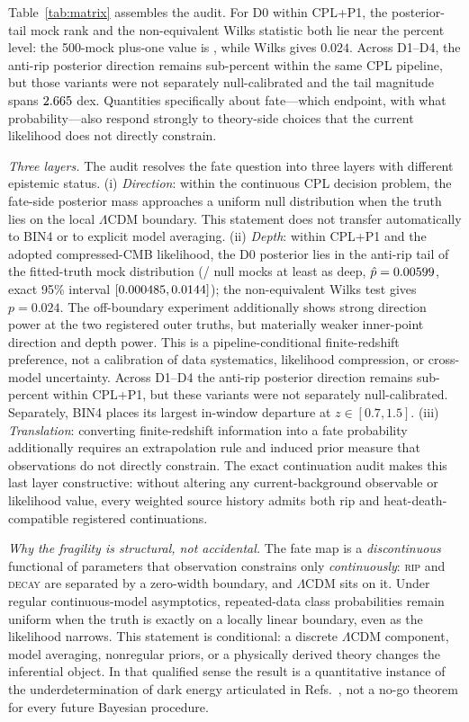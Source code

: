 \documentclass[a4paper,11pt]{article}
\newcommand{\lcdm}{\ensuremath{\Lambda\mathrm{CDM}}}
\begin{document}
Table~\ref{tab:matrix} assembles the audit. For D0 within CPL+P1, the
posterior-tail mock rank and the non-equivalent Wilks statistic both lie near
the percent level: the 500-mock plus-one value is \NullFivePlusOne, while
Wilks gives $0.024$. Across D1--D4, the anti-rip posterior direction remains
sub-percent within the same CPL pipeline, but those variants were not
separately null-calibrated and the tail magnitude spans $2.665$ dex.
Quantities specifically about fate---which endpoint, with what
probability---also respond strongly to theory-side choices that the current
likelihood does not directly constrain.

\emph{Three layers.} The audit resolves the fate question into three layers
with different epistemic status. (i) \emph{Direction}: within the continuous
CPL decision problem, the fate-side posterior mass approaches a uniform null
distribution when the truth lies on the local \lcdm{} boundary. This statement
does not transfer automatically to BIN4 or to explicit model averaging.
(ii) \emph{Depth}: within CPL+P1 and the adopted compressed-CMB likelihood,
the D0 posterior lies in the anti-rip tail of the fitted-truth mock distribution
(\NullFiveK/\NullFiveN{} null mocks at least as deep,
$\hat p=0.00599$, exact 95\% interval
$[0.000485,0.0144]$); the non-equivalent Wilks test gives
$p=0.024$. The off-boundary experiment additionally shows strong direction
power at the two registered outer truths, but materially weaker inner-point
direction and depth power. This is a pipeline-conditional finite-redshift
preference, not a calibration of data systematics, likelihood compression, or
cross-model uncertainty. Across D1--D4 the anti-rip posterior direction remains
sub-percent within CPL+P1, but these variants were not separately
null-calibrated. Separately, BIN4 places its largest in-window departure at
$z\in[0.7,1.5]$. (iii) \emph{Translation}: converting finite-redshift
information into a fate probability additionally requires an extrapolation
rule and induced prior measure that observations do not directly constrain.
The exact continuation audit makes this last layer constructive: without
altering any current-background observable or likelihood value, every weighted source history admits both
rip and heat-death-compatible registered continuations.

\emph{Why the fragility is structural, not accidental.} The fate map is a
\emph{discontinuous} functional of parameters that observation constrains
only \emph{continuously}: \textsc{rip} and \textsc{decay} are separated by a
zero-width boundary, and \lcdm{} sits on it. Under regular continuous-model
asymptotics, repeated-data class probabilities remain uniform when the truth
is exactly on a locally linear boundary, even as the likelihood narrows. This
statement is conditional: a discrete \lcdm{} component, model averaging,
nonregular priors, or a physically derived theory changes the inferential
object. In that qualified sense the result is a quantitative instance of the
underdetermination of dark energy articulated in
Refs.~\cite{WolfFerreira2023,WolfRead2026}, not a no-go theorem for every
future Bayesian procedure.
\end{document}
